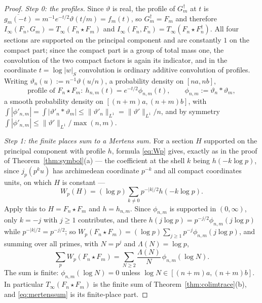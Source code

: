 \documentclass[11pt]{amsart}
\theoremstyle{definition}
\theoremstyle{remark}
\begin{document}
\begin{proof}
\emph{Step 0: the profiles.}  Since $\vartheta$ is real, the profile of
$G_m^{\dagger}$ at $t$ is $\overline{g_m(-t)}=m^{-1}e^{-t/2}\vartheta(t/m)=f_m(t)$,
so $G_m^{\dagger}=F_m$ and therefore $I_{\infty}(F_n,G_m)=T_{\infty}(F_n\star
F_m)$ and $I_{\infty}(F_n,F_n)=T_{\infty}(F_n\star F_n^{\dagger})$.  All four
sections are supported on the principal component and are constantly $1$ on the
compact part; since the compact part is a group of total mass one, the
convolution of the two compact factors is again its indicator, and in the
coordinate $t=\log|w|_S$ convolution is ordinary additive convolution of
profiles.  Writing $\vartheta_n(u):=n^{-1}\vartheta(u/n)$, a probability density on
$[na,nb]$,
\begin{equation}\label{eq:profileconv}
\text{profile of }F_n\star F_m:\ h_{n,m}(t)=e^{-t/2}\phi_{n,m}(t),\qquad
\phi_{n,m}:=\vartheta_n*\vartheta_m ,
\end{equation}
a smooth probability density on $[(n+m)a,(n+m)b]$, with
$\int|\phi'_{n,m}|=\int|\vartheta'_n*\vartheta_m|\le\lVert\vartheta'_n\rVert_{L^{1}}=
\lVert\vartheta'\rVert_{L^{1}}/n$, and by symmetry
$\int|\phi'_{n,m}|\le\lVert\vartheta'\rVert_{L^{1}}/\max(n,m)$.

\emph{Step 1: the finite places sum to a Mertens sum.}  For a section $H$
supported on the principal component with profile $h$, formula \eqref{eq:Wp}
gives, exactly as in the proof of Theorem~\ref{thm:symbol}(a) --- the
coefficient at the shell $k$ being $h(-k\log p)$, since $j_p(p^{k}u)$ has
archimedean coordinate $p^{-k}$ and all compact coordinates units, on which $H$
is constant ---
\begin{equation}\label{eq:Wpprofile}
W_p(H)=(\log p)\sum_{k\ne0}p^{-|k|/2}h(-k\log p).
\end{equation}
Apply this to $H=F_n\star F_m$ and $h=h_{n,m}$.  Since $\phi_{n,m}$ is
supported in $(0,\infty)$, only $k=-j$ with $j\ge1$ contributes, and there
$h(j\log p)=p^{-j/2}\phi_{n,m}(j\log p)$ while $p^{-|k|/2}=p^{-j/2}$; so
$W_p(F_n\star F_m)=(\log p)\sum_{j\ge1}p^{-j}\phi_{n,m}(j\log p)$, and summing
over all primes, with $N=p^{j}$ and $\Lambda(N)=\log p$,
\begin{equation}\label{eq:mertenssum}
\sum_pW_p(F_n\star F_m)=\sum_{N\ge2}\frac{\Lambda(N)}{N}\,\phi_{n,m}(\log N).
\end{equation}
The sum is finite: $\phi_{n,m}(\log N)=0$ unless $\log N\in[(n+m)a,(n+m)b]$.
In particular $T_{\infty}(F_n\star F_m)$ is the finite sum of
Theorem~\ref{thm:colimtrace}(b), and \eqref{eq:mertenssum} is its finite-place
part.


\end{proof}
\end{document}
